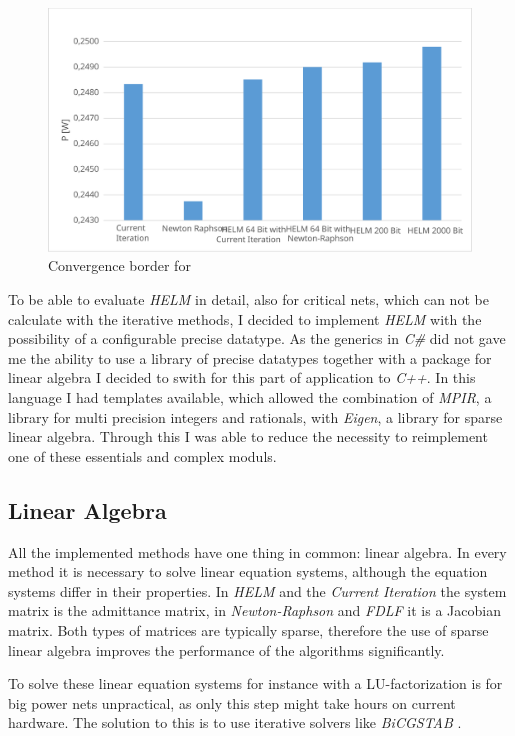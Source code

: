 \begin{figure}
	\centering
	\includegraphics[scale=0.7]{figures/convergence_border}
	\caption{Convergence border for }
	\label{fig:convergence_border}
\end{figure}

To be able to evaluate \emph{HELM} in detail, also for critical nets, which can not be calculate with the iterative methods, I decided to implement \emph{HELM} with the possibility of a configurable precise datatype. As the generics in \emph{C\#} did not gave me the ability to use a library of precise datatypes together with a package for linear algebra I decided to swith for this part of application to \emph{C++}. In this language I had templates available, which allowed the combination of \emph{MPIR}, a library for multi precision integers and rationals, with \emph{Eigen}, a library for sparse linear algebra. Through this I was able to reduce the necessity to reimplement one of these essentials and complex moduls.

\subsection{Linear Algebra}
All the implemented methods have one thing in common: linear algebra. In every method it is necessary to solve linear equation systems, although the equation systems differ in their properties. In \emph{HELM} and the \emph{Current Iteration} the system matrix is the admittance matrix, in \emph{Newton-Raphson} and \emph{FDLF} it is a Jacobian matrix. Both types of matrices are typically sparse, therefore the use of sparse linear algebra improves the performance of the algorithms significantly.

To solve these linear equation systems for instance with a LU-factorization is for big power nets unpractical, as only this step might take hours on current hardware. The solution to this is to use iterative solvers like \emph{BiCGSTAB} \cite{bicgstab}.

